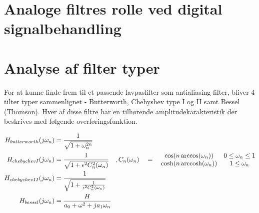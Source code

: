 

\section{Analoge filtres rolle ved digital signalbehandling}\label{sec:filter_intro}

\section{Analyse af filter typer}\label{sec:filter_topologier}
For at kunne finde frem til et passende lavpasfilter som antialiasing filter, bliver 4 tilter typer sammenlignet - Butterworth, Chebyshev type I og II samt Bessel (Thomson).
Hver af disse filtre har en tilhørende amplitudekarakteristik  der beskrives med følgende overføringsfunktion.

\begin{align} 
H_{butterworth}(j\omega_n) &= \frac{1}{\sqrt{1 + \omega_n^{2n}}}  \\
H_{chebychevI}(j\omega_n) &= \frac{1}{\sqrt{1 + \epsilon^2 C_n^2(\omega_n)}} \quad, C_n(\omega_n)\quad = \quad 
\begin{matrix}
\cos(n\arccos(\omega_n)) & 0 \le \omega_n \le 1 \\  \cosh(n \operatorname{arccosh}(\omega_n)) & 1 \le \omega_n 
\end{matrix}\\
H_{chebychevII}(j\omega_n) &= \frac{1}{\sqrt{1 + \frac{1}{\epsilon^2 C_n^2(\omega_n)}}} \quad\\
H_{bessel} (j\omega_n) &= \frac{H}{a_0 + \omega^2 + ja_1\omega_n}
\end{align}


